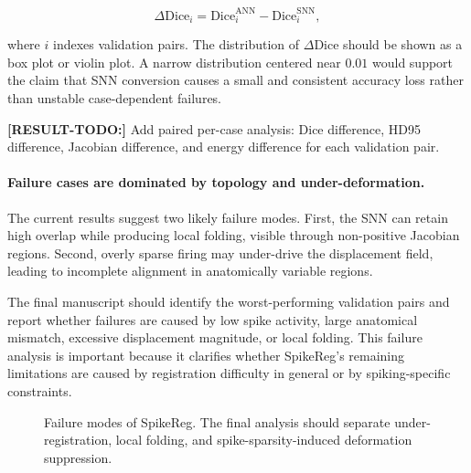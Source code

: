 \begin{equation}
\Delta \mathrm{Dice}_i
=
\mathrm{Dice}_{i}^{\mathrm{ANN}}
-
\mathrm{Dice}_{i}^{\mathrm{SNN}},
\end{equation}

where $i$ indexes validation pairs. The distribution of $\Delta \mathrm{Dice}$ should be shown as a box plot or violin plot. A narrow distribution centered near $0.01$ would support the claim that SNN conversion causes a small and consistent accuracy loss rather than unstable case-dependent failures.

\textbf{[RESULT-TODO:]} Add paired per-case analysis: Dice difference, HD95 difference, Jacobian difference, and energy difference for each validation pair.


\paragraph{Failure cases are dominated by topology and under-deformation.}
The current results suggest two likely failure modes. First, the SNN can retain high overlap while producing local folding, visible through non-positive Jacobian regions. Second, overly sparse firing may under-drive the displacement field, leading to incomplete alignment in anatomically variable regions.

The final manuscript should identify the worst-performing validation pairs and report whether failures are caused by low spike activity, large anatomical mismatch, excessive displacement magnitude, or local folding. This failure analysis is important because it clarifies whether SpikeReg's remaining limitations are caused by registration difficulty in general or by spiking-specific constraints.

\begin{figure}[t]
\centering
{}
\caption{
Failure modes of SpikeReg. 
The final analysis should separate under-registration, local folding, and spike-sparsity-induced deformation suppression.
}
\label{fig:failure}
\end{figure}


